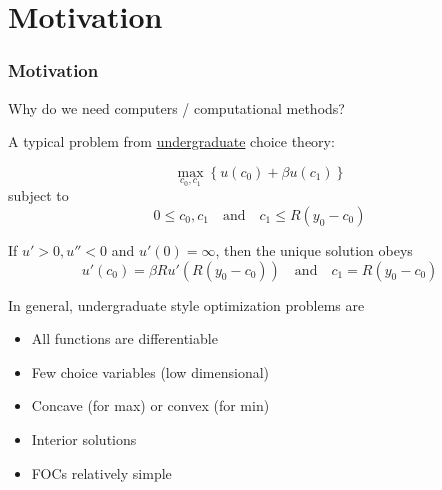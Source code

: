 \section{Motivation}

\begin{frame}
    \frametitle{Motivation}

    Why do we need computers / computational methods?

    \vspace{1em}

    \Eg  A typical problem from \underline{undergraduate} choice theory:

    \begin{equation}
        \max_{c_0, c_1} \left\{   u(c_0) + \beta u(c_1) \right\}
    \end{equation}
    subject to 
    \begin{equation}
       0 \leq c_0, c_1
       \quad \text{and} \quad
       c_1 \leq R(y_0 - c_0)
    \end{equation}

            \vspace{0.5em}
            \vspace{0.5em}
    If $u' > 0, u'' < 0$ and $u'(0)=\infty$, then the unique
    solution obeys
    \begin{equation*}
        u'(c_0) = \beta R u'(R(y_0 - c_0))
        \quad \text{and} \quad
       c_1 = R(y_0 - c_0)
    \end{equation*}

\end{frame}

\begin{frame}

    In general, undergraduate style optimization problems are 

    \begin{itemize}
        \item All functions are differentiable
            \vspace{0.5em}
        \item Few choice variables (low dimensional)
            \vspace{0.51em}
        \item Concave (for max) or convex (for min)
            \vspace{0.51em}
        \item Interior solutions
            \vspace{0.51em}
        \item FOCs relatively simple
    \end{itemize}



\end{frame}




